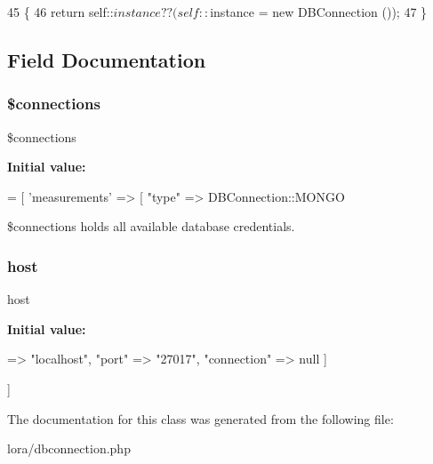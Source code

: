 \begin{DoxyCode}
45                                    \{
46         \textcolor{keywordflow}{return} self::$instance ?? (self::$instance = \textcolor{keyword}{new} DBConnection ());
47     \}
\end{DoxyCode}


\subsection{Field Documentation}
\mbox{\label{class_d_b_connection_a8d01870fbfcf9232c0e94c50a7142331}} 
\subsubsection{\$connections}
{\footnotesize\ttfamily \$connections\hspace{0.3cm}{\ttfamily [private]}}

{\bfseries Initial value\+:}
\begin{DoxyCode}
= [
                \textcolor{stringliteral}{'measurements'} => [
                    \textcolor{stringliteral}{"type"}          => DBConnection::MONGO
\end{DoxyCode}


\$connections holds all available database credentials. 

\mbox{\label{class_d_b_connection_a832ddc04754e8a43d4f3c6165b1294a7}} 
\subsubsection{host}
{\footnotesize\ttfamily host}

{\bfseries Initial value\+:}
\begin{DoxyCode}
=> \textcolor{stringliteral}{"localhost"},
                    \textcolor{stringliteral}{"port"}          => \textcolor{stringliteral}{"27017"},
                    \textcolor{stringliteral}{"connection"}    => null
                ]
                
            ]
\end{DoxyCode}


The documentation for this class was generated from the following file\+:\begin{DoxyCompactItemize}
\item 
lora/dbconnection.\+php\end{DoxyCompactItemize}
